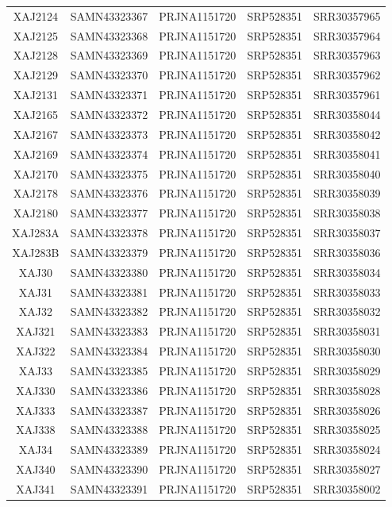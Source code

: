 \documentclass[
]{book}
\begin{document}
\begin{longtable}[]{@{}ccccc@{}}
XAJ2124 & SAMN43323367 & PRJNA1151720 & SRP528351 & SRR30357965 \\
XAJ2125 & SAMN43323368 & PRJNA1151720 & SRP528351 & SRR30357964 \\
XAJ2128 & SAMN43323369 & PRJNA1151720 & SRP528351 & SRR30357963 \\
XAJ2129 & SAMN43323370 & PRJNA1151720 & SRP528351 & SRR30357962 \\
XAJ2131 & SAMN43323371 & PRJNA1151720 & SRP528351 & SRR30357961 \\
XAJ2165 & SAMN43323372 & PRJNA1151720 & SRP528351 & SRR30358044 \\
XAJ2167 & SAMN43323373 & PRJNA1151720 & SRP528351 & SRR30358042 \\
XAJ2169 & SAMN43323374 & PRJNA1151720 & SRP528351 & SRR30358041 \\
XAJ2170 & SAMN43323375 & PRJNA1151720 & SRP528351 & SRR30358040 \\
XAJ2178 & SAMN43323376 & PRJNA1151720 & SRP528351 & SRR30358039 \\
XAJ2180 & SAMN43323377 & PRJNA1151720 & SRP528351 & SRR30358038 \\
XAJ283A & SAMN43323378 & PRJNA1151720 & SRP528351 & SRR30358037 \\
XAJ283B & SAMN43323379 & PRJNA1151720 & SRP528351 & SRR30358036 \\
XAJ30 & SAMN43323380 & PRJNA1151720 & SRP528351 & SRR30358034 \\
XAJ31 & SAMN43323381 & PRJNA1151720 & SRP528351 & SRR30358033 \\
XAJ32 & SAMN43323382 & PRJNA1151720 & SRP528351 & SRR30358032 \\
XAJ321 & SAMN43323383 & PRJNA1151720 & SRP528351 & SRR30358031 \\
XAJ322 & SAMN43323384 & PRJNA1151720 & SRP528351 & SRR30358030 \\
XAJ33 & SAMN43323385 & PRJNA1151720 & SRP528351 & SRR30358029 \\
XAJ330 & SAMN43323386 & PRJNA1151720 & SRP528351 & SRR30358028 \\
XAJ333 & SAMN43323387 & PRJNA1151720 & SRP528351 & SRR30358026 \\
XAJ338 & SAMN43323388 & PRJNA1151720 & SRP528351 & SRR30358025 \\
XAJ34 & SAMN43323389 & PRJNA1151720 & SRP528351 & SRR30358024 \\
XAJ340 & SAMN43323390 & PRJNA1151720 & SRP528351 & SRR30358027 \\
XAJ341 & SAMN43323391 & PRJNA1151720 & SRP528351 & SRR30358002 \\

\end{longtable}
\end{document}
